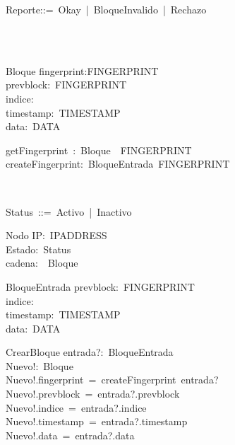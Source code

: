 \begin{zed}
Reporte::=~Okay~|~BloqueInvalido~|~Rechazo~\\
\\
\end{zed}
\begin{zed}
\\
\end{zed}
\begin{schema}{Bloque}
fingerprint:FINGERPRINT\\
prevblock:~FINGERPRINT\\
indice:~\nat\\
timestamp:~TIMESTAMP\\
data:~DATA\\
\end{schema}
\begin{axdef}
getFingerprint~:~Bloque~\fun~FINGERPRINT\\
createFingerprint:~BloqueEntrada\fun~FINGERPRINT\\
\end{axdef}
\begin{zed}
[IPADDRESS]\\
\end{zed}
\begin{zed}
Status~::=~Activo~|~Inactivo\\
\end{zed}
\begin{schema}{Nodo}
IP:~IPADDRESS\\
Estado:~Status\\
cadena:~\seq~Bloque\\
\end{schema}
\begin{schema}{BloqueEntrada}
prevblock:~FINGERPRINT~\\
indice:~\nat\\
timestamp:~TIMESTAMP\\
data:~DATA\\
\end{schema}
\begin{schema}{CrearBloque}
entrada?:~BloqueEntrada\\
Nuevo!:~Bloque\\
\where
Nuevo!.fingerprint~=~createFingerprint~entrada?\\
Nuevo!.prevblock~=~entrada?.prevblock\\
Nuevo!.indice~=~entrada?.indice\\
Nuevo!.timestamp~=~entrada?.timestamp\\
Nuevo!.data~=~entrada?.data\\
\end{schema}
